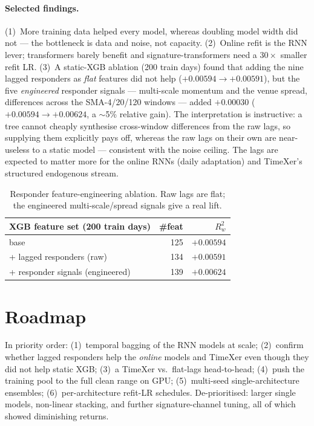 \documentclass[11pt]{article}
\newcommand{\Rw}{R^2_w}
\begin{document}
\paragraph{Selected findings.}
(1)~More training data helped every model, whereas doubling model width did not
--- the bottleneck is data and noise, not capacity. (2)~Online refit is the RNN
lever; transformers barely benefit and signature-transformers need a
$30\times$ smaller refit LR. (3)~A static-XGB ablation (200 train days)
found that adding the nine lagged responders as \emph{flat} features did not
help ($+0.00594 \to +0.00591$), but the five \emph{engineered} responder
signals --- multi-scale momentum and the venue spread, differences across the
SMA-4/20/120 windows --- added $+0.00030$ ($+0.00594 \to +0.00624$, a $\sim$5\%
relative gain). The interpretation is instructive: a tree cannot cheaply
synthesise cross-window differences from the raw lags, so supplying them
explicitly pays off, whereas the raw lags on their own are near-useless to a
static model --- consistent with the noise ceiling. The lags are expected to
matter more for the online RNNs (daily adaptation) and TimeXer's structured
endogenous stream.

\begin{table}[h]
\centering
\small
\begin{tabular}{lrr}
\toprule
XGB feature set (200 train days) & \#feat & $\Rw$ \\
\midrule
base                          & 125 & $+0.00594$ \\
\;+ lagged responders (raw)   & 134 & $+0.00591$ \\
\;+ responder signals (engineered) & 139 & $\mathbf{+0.00624}$ \\
\bottomrule
\end{tabular}
\caption{Responder feature-engineering ablation. Raw lags are flat; the
engineered multi-scale/spread signals give a real lift.}
\end{table}

\section{Roadmap}
In priority order: (1)~temporal bagging of the RNN models at scale;
(2)~confirm whether lagged responders help the \emph{online} models and TimeXer
even though they did not help static XGB; (3)~a TimeXer vs.\ flat-lags
head-to-head; (4)~push the training pool to the full clean range on GPU;
(5)~multi-seed single-architecture ensembles; (6)~per-architecture refit-LR
schedules. De-prioritised: larger single models, non-linear stacking, and
further signature-channel tuning, all of which showed diminishing returns.
\end{document}
